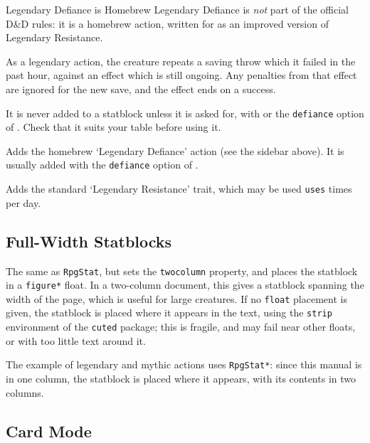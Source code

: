 			{
				\begin{RpgSidebar}{Legendary Defiance is Homebrew}
					Legendary Defiance is \textit{not} part of the official D\&D rules: it is a homebrew action, written for \rpgtex{} as an improved version of Legendary Resistance.

					As a legendary action, the creature repeats a saving throw which it failed in the past hour, against an effect which is still ongoing. Any penalties from that effect are ignored for the new save, and the effect ends on a success.

					It is never added to a statblock unless it is asked for, with  or the \texttt{defiance} option of . Check that it suits your table before using it.
				\end{RpgSidebar}
				Adds the homebrew `Legendary Defiance' action (see the sidebar above). It is usually added with the \texttt{defiance} option of .
			}
			{
				Adds the standard `Legendary Resistance' trait, which may be used \texttt{uses} times per day.
			}



	\subsection{Full-Width Statblocks}

		{
			The same as \texttt{RpgStat}, but sets the \texttt{twocolumn} property, and places the statblock in a \texttt{figure*} float. In a two-column document, this gives a statblock spanning the width of the page, which is useful for large creatures. If no \texttt{float} placement is given, the statblock is placed where it appears in the text, using the \texttt{strip} environment of the \texttt{cuted} package; this is fragile, and may fail near other floats, or with too little text around it.
		}

		The example of legendary and mythic actions  uses \texttt{RpgStat*}: since this manual is in one column, the statblock is placed where it appears, with its contents in two columns.

	\subsection{Card Mode}

